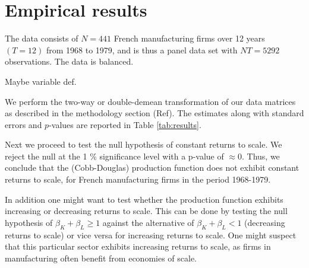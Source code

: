 \section{Empirical results}

The data consists of $N = 441$ French manufacturing firms over 12 years $(T=12)$ from 1968 to 1979, and is thus a panel data set with $NT = 5292$ observations. The data is balanced. 

Maybe variable def. 

We perform the two-way or double-demean transformation of our data matrices as described in the methodology section (Ref). The estimates along with standard errors and $p$-values are reported in Table \ref{tab:results}. 

Next we proceed to test the null hypothesis of constant returns to scale. We reject the null at the 1 \% significance level with a p-value of $\approx 0$. Thus, we conclude that the (Cobb-Douglas) production function does not exhibit constant returns to scale, for French manufacturing firms in the period 1968-1979. 

In addition one might want to test whether the production function exhibits increasing or decreasing returns to scale. This can be done by testing the null hypothesis of $\beta_K + \beta_L \geq 1$ against the alternative of $\beta_K + \beta_L < 1$ (decreasing returns to scale) or vice versa for increasing returns to scale. One might suspect that this particular sector exhibits increasing returns to scale, as firms in manufacturing often benefit from economies of scale.

